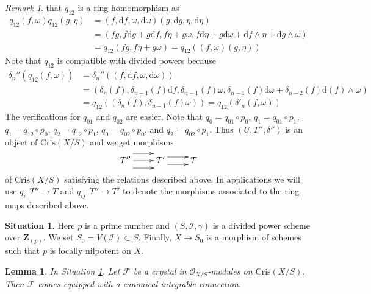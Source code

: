\documentclass{amsart}
\theoremstyle{plain}
\newtheorem{lemma}[subsection]{Lemma}
\theoremstyle{definition}
\newtheorem{situation}[subsection]{Situation}
\theoremstyle{remark}
\newtheorem{remark}[subsection]{Remark}
\numberwithin{equation}{subsection}
\begin{document}
\begin{remark}
that $q_{12}$ is a ring homomorphism as
\begin{align*}
q_{12}(f, \omega)q_{12}(g, \eta) & =
(f, \text{d}f, \omega, \text{d}\omega)(g, \text{d}g, \eta, \text{d}\eta) \\
& =
(fg, f\text{d}g + g \text{d}f, f\eta + g\omega,
f\text{d}\eta + g\text{d}\omega + \text{d}f \wedge \eta +
\text{d}g \wedge \omega) \\
& = q_{12}(fg, f\eta + g\omega) = q_{12}((f, \omega)(g, \eta))
\end{align*}
Note that $q_{12}$ is compatible with divided powers because
\begin{align*}
\delta_n''(q_{12}(f, \omega)) & =
\delta_n''((f, \text{d}f, \omega, \text{d}\omega)) \\
& =
(\delta_n(f), \delta_{n - 1}(f)\text{d}f, \delta_{n - 1}(f)\omega,
\delta_{n - 1}(f)\text{d}\omega + \delta_{n - 2}(f)\text{d}(f) \wedge \omega)
\\
& = q_{12}((\delta_n(f), \delta_{n - 1}(f)\omega)) =
q_{12}(\delta'_n(f, \omega))
\end{align*}
The verifications for $q_{01}$ and $q_{02}$ are easier.
Note that $q_0 = q_{01} \circ p_0$, $q_1 = q_{01} \circ p_1$,
$q_1 = q_{12} \circ p_0$, $q_2 = q_{12} \circ p_1$,
$q_0 = q_{02} \circ p_0$, and $q_2 = q_{02} \circ p_1$.
Thus $(U, T'', \delta'')$ is an object of $\text{Cris}(X/S)$
and we get morphisms
$$
\xymatrix{
T''
\ar@<2ex>[r]
\ar@<0ex>[r]
\ar@<-2ex>[r]
&
T'
\ar@<1ex>[r]
\ar@<-1ex>[r]
&
T
}
$$
of $\text{Cris}(X/S)$ satisfying the relations described above.
In applications we will use $q_i : T'' \to T$ and
$q_{ij} : T'' \to T'$ to denote the morphisms associated to the
ring maps described above.
\end{remark}

\begin{situation}
\label{situation-global}
Here $p$ is a prime number and $(S, \mathcal{I}, \gamma)$ is a divided power
scheme over $\mathbf{Z}_{(p)}$. We set $S_0 = V(\mathcal{I}) \subset S$.
Finally, $X \to S_0$ is a morphism of schemes such that $p$ is
locally nilpotent on $X$.
\end{situation}

\begin{lemma}
\label{lemma-automatic-connection}
In Situation \ref{situation-global}.
Let $\mathcal{F}$ be a crystal in $\mathcal{O}_{X/S}$-modules
on $\text{Cris}(X/S)$. Then $\mathcal{F}$ comes equipped with a
canonical integrable connection.
\end{lemma}
\end{document}

